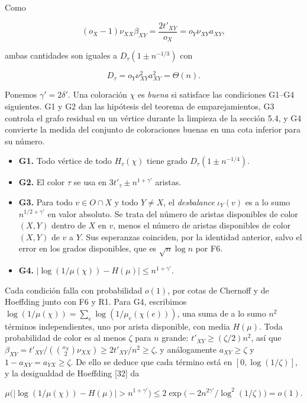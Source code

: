 \documentclass[spanish,11pt,a4paper]{article}
\providecommand{\tightlist}{\setlength{\itemsep}{0pt}\setlength{\parskip}{0pt}}
\begin{document}
Como

\nopagebreak[4]
\[(o_X-1)\nu_{XX}\beta_{XY}=\frac{2t'_{XY}}{o_X}=o_Y\nu_{XY}a_{XY},\]

ambas cantidades son iguales a \(D_\tau(1\pm n^{-1/3})\) con

\nopagebreak[4]
\[D_\tau=o_Y\nu_{XY}^2a_{XY}^2=\Theta(n).\]

Ponemos \(\gamma'=2\delta'\). Una coloración \(\chi\) es \emph{buena} si satisface las condiciones G1--G4 siguientes. G1 y G2 dan las hipótesis del teorema de emparejamientos, G3 controla el grafo residual en un vértice durante la limpieza de la sección 5.4, y G4 convierte la medida del conjunto de coloraciones buenas en una cota inferior para su número.

\begin{itemize}
\tightlist
\item
  \textbf{G1.} Todo vértice de todo \(H_\tau(\chi)\) tiene grado \(D_\tau(1\pm n^{-1/4})\).
\item
  \textbf{G2.} El color \(\tau\) se usa en \(3t'_\tau\pm n^{1+\gamma'}\) aristas.
\item
  \textbf{G3.} Para todo \(v\in O\cap X\) y todo \(Y\ne X\), el \emph{desbalance} \(\iota_Y(v)\) es a lo sumo \(n^{1/2+\gamma'}\) en valor absoluto. Se trata del número de aristas disponibles de color \((X,Y)\) dentro de \(X\) en \(v\), menos el número de aristas disponibles de color \((X,Y)\) de \(v\) a \(Y\). Sus esperanzas coinciden, por la identidad anterior, salvo el error en los grados disponibles, que es \(\sqrt n\log n\) por F6.
\item
  \textbf{G4.} \(|\log(1/\mu(\chi))-H(\mu)|\le n^{1+\gamma'}\).
\end{itemize}

Cada condición falla con probabilidad \(o(1)\), por cotas de Chernoff y de Hoeffding junto con F6 y R1. Para G4, escribimos \(\log(1/\mu(\chi))=\sum_e\log(1/\mu_e(\chi(e)))\), una suma de a lo sumo \(n^2\) términos independientes, uno por arista disponible, con media \(H(\mu)\). Toda probabilidad de color es al menos \(\zeta\) para \(n\) grande: \(t'_{XY}\ge(\zeta/2)n^2\), así que \(\beta_{XY}=t'_{XY}/(\binom{o_X}{2}\nu_{XX})\ge2t'_{XY}/n^2\ge\zeta\), y análogamente \(a_{XY}\ge\zeta\) y \(1-a_{XY}=a_{YX}\ge\zeta\). De ello se deduce que cada término está en \([0,\log(1/\zeta)]\), y la desigualdad de Hoeffding {[}32{]} da

\nopagebreak[4]
\[\mu\big(|\log(1/\mu(\chi))-H(\mu)|>n^{1+\gamma'}\big)\le2\exp\big(-2n^{2\gamma'}/\log^2(1/\zeta)\big)=o(1).\]
\end{document}
